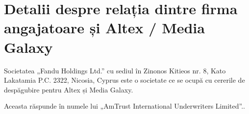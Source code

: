 \section{Detalii despre relația dintre firma angajatoare și Altex / Media Galaxy}
	Societatea „Fandu Holdings Ltd.” cu sediul în Zinonos Kitieos nr. 8, Kato Lakatamia P.C. 2322, Nicosia, Cyprus\cite{fandu_uk}
	este o societate ce se ocupă cu cererile de despăgubire pentru Altex și Media Galaxy\cite{media_galaxy}.

	Aceasta răspunde în numele lui „AmTrust International Underwriters Limited”.\cite{media_galaxy}.